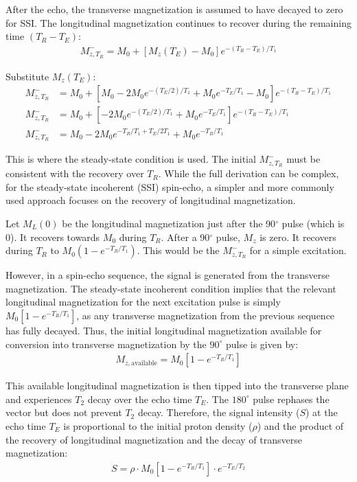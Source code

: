 \documentclass[10pt,a4paper,twoside]{article}
\begin{document}
After the echo, the transverse magnetization is assumed to have decayed to zero for SSI. The longitudinal magnetization continues to recover during the remaining time $(T_R-T_E)$:
\begin{align*}
M_{z,T_R}^- = M_0 + \left[M_z(T_E) - M_0\right] e^{-(T_R-T_E)/T_1}
\end{align*}

Substitute $M_z(T_E)$:
\begin{align*}
M_{z,T_R}^- &= M_0 + \left[ M_0 - 2M_0 e^{-(T_E/2)/T_1} + M_0 e^{-T_E/T_1} - M_0\right] e^{-(T_R-T_E)/T_1} \\
M_{z,T_R}^- &= M_0 + \left[ -2M_0 e^{-(T_E/2)/T_1} + M_0 e^{-T_E/T_1}\right] e^{-(T_R-T_E)/T_1} \\
M_{z,T_R}^- &= M_0 - 2M_0 e^{-T_R/T_1 + T_E/2T_1} + M_0 e^{-T_R/T_1}
\end{align*}

This is where the steady-state condition is used. The initial $M_{z,T_R}^-$ must be consistent with the recovery over $T_R$. While the full derivation can be complex, for the steady-state incoherent (SSI) spin-echo, a simpler and more commonly used approach focuses on the recovery of longitudinal magnetization.

Let $M_L(0)$ be the longitudinal magnetization just after the 90$^\circ$ pulse (which is 0). It recovers towards $M_0$ during $T_R$. After a 90$^\circ$ pulse, $M_z$ is zero. It recovers during $T_R$ to $M_0(1-e^{-T_R/T_1})$. This would be the $M_{z,T_R}^-$ for a simple excitation. 

However, in a spin-echo sequence, the signal is generated from the transverse magnetization. The steady-state incoherent condition implies that the relevant longitudinal magnetization for the next excitation pulse is simply $M_0\left[ 1-e^{-T_R/T_1} \right]$, as any transverse magnetization from the previous sequence has fully decayed.
Thus, the initial longitudinal magnetization available for conversion into transverse magnetization by the $90^\circ$ pulse is given by:
\begin{align*}
M_{z,\text{available}} = M_0 \left[ 1-e^{-T_R/T_1} \right]
\end{align*}

This available longitudinal magnetization is then tipped into the transverse plane and experiences $T_2$ decay over the echo time $T_E$. The $180^\circ$ pulse rephases the vector but does not prevent $T_2$ decay. Therefore, the signal intensity ($S$) at the echo time $T_E$ is proportional to the initial proton density ($\rho$) and the product of the recovery of longitudinal magnetization and the decay of transverse magnetization:
\begin{align*}
S = \rho \cdot M_0 \left[ 1-e^{-T_R/T_1} \right] \cdot e^{-T_E/T_2}
\end{align*}
\end{document}
